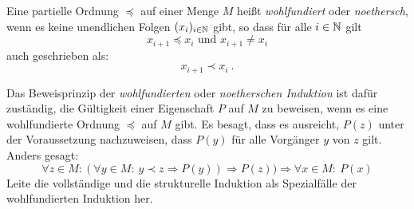 \begin{aufgabe}
Eine partielle Ordnung $\preccurlyeq$ auf einer Menge $M$ heißt
\textit{wohlfundiert} oder \textit{noethersch}, wenn es keine
unendlichen Folgen $(x_i)_{i\in \mathbb{N}}$ gibt, so dass für alle $i\in\mathbb{N}$ gilt
%
\begin{displaymath}
  x_{i+1} \preccurlyeq x_{i} \text{ und } x_{i+1} \neq x_{i}
\end{displaymath}
%
auch geschrieben als:
%
\begin{displaymath}
  x_{i+1} \prec x_{i}\ .
\end{displaymath}
%

Das Beweisprinzip der \textit{wohlfundierten} oder \textit{noetherschen Induktion} ist dafür zuständig, die
Gültigkeit einer Eigenschaft $P$ auf $M$ zu beweisen, wenn es eine
wohlfundierte Ordnung $\preccurlyeq$ auf $M$ gibt.  Es besagt, dass
es ausreicht, $P(z)$ unter der Voraussetzung nachzuweisen, dass $P(y)$
für alle Vorgänger $y$ von $z$ gilt.  Anders gesagt:
%
\begin{displaymath}
  \forall z\in M:(\forall y\in M:~ y\prec z \Rightarrow P(y)) \Rightarrow P(z))
  \Rightarrow \forall x \in M:~P(x)
\end{displaymath}
%
Leite die vollständige und die strukturelle Induktion als Spezialfälle
der wohlfundierten Induktion her.
\end{aufgabe}



